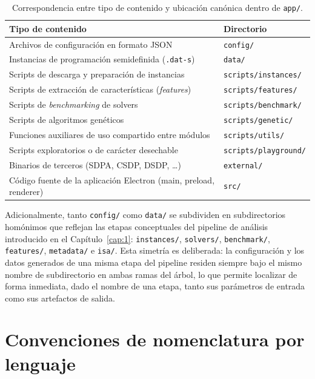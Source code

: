 \begin{table}[htbp]
\centering
\caption{Correspondencia entre tipo de contenido y ubicaci\'on can\'onica
dentro de \texttt{app/}.}
\label{tab:jerarquia-carpetas}
\begin{tabular}{ll}
\toprule
\textbf{Tipo de contenido} & \textbf{Directorio} \\
\midrule
Archivos de configuraci\'on en formato JSON & \texttt{config/} \\
Instancias de programaci\'on semidefinida (\texttt{.dat-s}) & \texttt{data/} \\
Scripts de descarga y preparaci\'on de instancias & \texttt{scripts/instances/} \\
Scripts de extracci\'on de caracter\'isticas (\emph{features}) & \texttt{scripts/features/} \\
Scripts de \emph{benchmarking} de solvers & \texttt{scripts/benchmark/} \\
Scripts de algoritmos gen\'eticos & \texttt{scripts/genetic/} \\
Funciones auxiliares de uso compartido entre m\'odulos & \texttt{scripts/utils/} \\
Scripts exploratorios o de car\'acter desechable & \texttt{scripts/playground/} \\
Binarios de terceros (SDPA, CSDP, DSDP, \ldots) & \texttt{external/} \\
C\'odigo fuente de la aplicaci\'on Electron (main, preload, renderer) & \texttt{src/} \\
\bottomrule
\end{tabular}
\end{table}

Adicionalmente, tanto \texttt{config/} como \texttt{data/} se subdividen en
subdirectorios homónimos que reflejan las etapas conceptuales del pipeline
de an\'alisis introducido en el Cap\'itulo~\ref{cap:1}:
\texttt{instances/}, \texttt{solvers/}, \texttt{benchmark/},
\texttt{features/}, \texttt{metadata/} e \texttt{isa/}. Esta simetr\'ia es
deliberada: la configuraci\'on y los datos generados de una misma etapa del
pipeline residen siempre bajo el mismo nombre de subdirectorio en ambas
ramas del \'arbol, lo que permite localizar de forma inmediata, dado el
nombre de una etapa, tanto sus par\'ametros de entrada como sus artefactos
de salida.

\section{Convenciones de nomenclatura por lenguaje}

